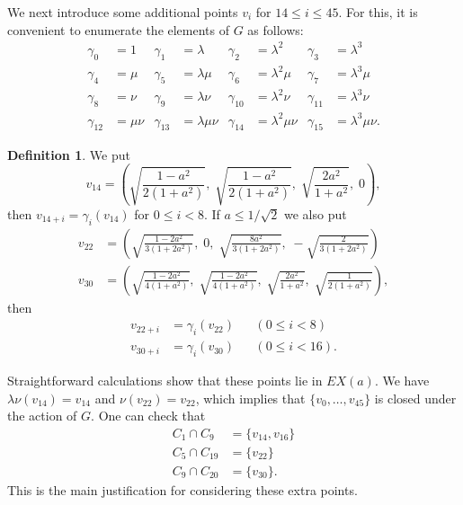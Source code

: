 \documentclass[reqno]{amsart}
\newcommand{\gm}        {\gamma}
\newcommand{\lm}        {\lambda}
\newcommand{\rt}        {\sqrt{2}}
\renewcommand{\:}{\colon}
\theoremstyle{definition}
\newtheorem{definition}[theorem]{Definition}
\begin{document}
We next introduce some additional points $v_i$ for $14\leq i\leq 45$.
For this, it is convenient to enumerate the elements of $G$ as
follows:
\begin{align*}
 \gm_0    &= 1           & \gm_1    &= \lm &
 \gm_2    &= \lm^2       & \gm_3    &= \lm^3 \\
 \gm_4    &= \mu         & \gm_5    &= \lm\mu &
 \gm_6    &= \lm^2\mu    & \gm_7    &= \lm^3\mu \\
 \gm_8    &= \nu         & \gm_9    &= \lm\nu &
 \gm_{10} &= \lm^2\nu    & \gm_{11} &= \lm^3\nu \\
 \gm_{12} &= \mu\nu      & \gm_{13} &= \lm\mu\nu &
 \gm_{14} &= \lm^2\mu\nu & \gm_{15} &= \lm^3\mu\nu.
\end{align*}

\begin{definition}
 We put
 \[
  v_{14}  = \left(\sqrt{\frac{1-a^2}{2(1+a^2)}},\;
                  \sqrt{\frac{1-a^2}{2(1+a^2)}},\;
                  \sqrt{\frac{2a^2}{1+a^2}},\;
                  0\right),
 \]
 then $v_{14+i}=\gm_i(v_{14})$ for $0\leq i<8$.  If
 $a\leq 1/\rt$ we also put
 \begin{align*}
  v_{22} &= \left(
             \sqrt{\frac{1-2a^2}{3(1+2a^2)}},\;
             0,\;
             \sqrt{\frac{8a^2}{3(1+2a^2)}},\;
             -\sqrt{\frac{2}{3(1+2a^2)}}
            \right) \\
  v_{30} &= \left(
             \sqrt{\frac{1-2a^2}{4(1+a^2)}},\;
             \sqrt{\frac{1-2a^2}{4(1+a^2)}},\;
             \sqrt{\frac{2a^2}{1+a^2}},\;
             \sqrt{\frac{1}{2(1+a^2)}}
            \right),
 \end{align*}
 then
 \begin{align*}
  v_{22+i} &= \gm_i(v_{22}) && (0\leq i<8) \\
  v_{30+i} &= \gm_i(v_{30}) && (0\leq i<16).
 \end{align*}
\end{definition}

Straightforward calculations show that these points lie in $EX(a)$.
We have $\lm\nu(v_{14})=v_{14}$ and $\nu(v_{22})=v_{22}$, which
implies that $\{v_0,\dotsc,v_{45}\}$ is closed under the action of
$G$.  One can check that
\begin{align*}
 C_1\cap C_9    &= \{v_{14},v_{16}\} \\
 C_5\cap C_{19} &= \{v_{22}\} \\
 C_9\cap C_{20} &= \{v_{30}\}.
\end{align*}
This is the main justification for considering these extra points.
\end{document}
